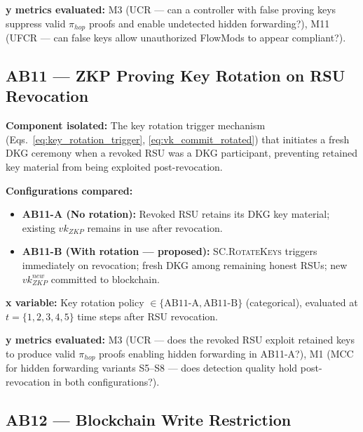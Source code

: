 \documentclass[12pt, a4paper]{report}
\begin{document}
{{\textbf{y metrics evaluated:} M3 (UCR — can a
controller with false proving keys suppress valid
$\pi_{hop}$ proofs and enable undetected hidden
forwarding?), M11 (UFCR — can false keys allow
unauthorized FlowMods to appear compliant?).


\subsection{AB11 — ZKP Proving Key Rotation on
RSU Revocation}
\label{sec:ab11}

\textbf{Component isolated:}
The key rotation trigger mechanism
(Eqs.~\ref{eq:key_rotation_trigger},
\ref{eq:vk_commit_rotated}) that initiates a fresh
\ac{DKG} ceremony when a revoked \ac{RSU} was a
\ac{DKG} participant, preventing retained key
material from being exploited post-revocation.

\textbf{Configurations compared:}
\begin{itemize}
    \item \textbf{AB11-A (No rotation):} Revoked
    \ac{RSU} retains its \ac{DKG} key material;
    existing $vk_{ZKP}$ remains in use after
    revocation.
    \item \textbf{AB11-B (With rotation —
    proposed):} \textsc{SC.RotateKeys} triggers
    immediately on revocation; fresh \ac{DKG}
    among remaining honest \ac{RSU}s; new
    $vk_{ZKP}^{new}$ committed to blockchain.
\end{itemize}

\textbf{x variable:} Key rotation policy
$\in \{\text{AB11-A}, \text{AB11-B}\}$ (categorical),
evaluated at $t = \{1, 2, 3, 4, 5\}$ time steps
after RSU revocation.

\textbf{y metrics evaluated:} M3 (UCR — does the
revoked RSU exploit retained keys to produce valid
$\pi_{hop}$ proofs enabling hidden forwarding in
AB11-A?), M1 (MCC for hidden forwarding variants
S5--S8 — does detection quality hold post-revocation
in both configurations?).


\subsection{AB12 — Blockchain Write Restriction}
\label{sec:ab12}

}}
\end{document}
